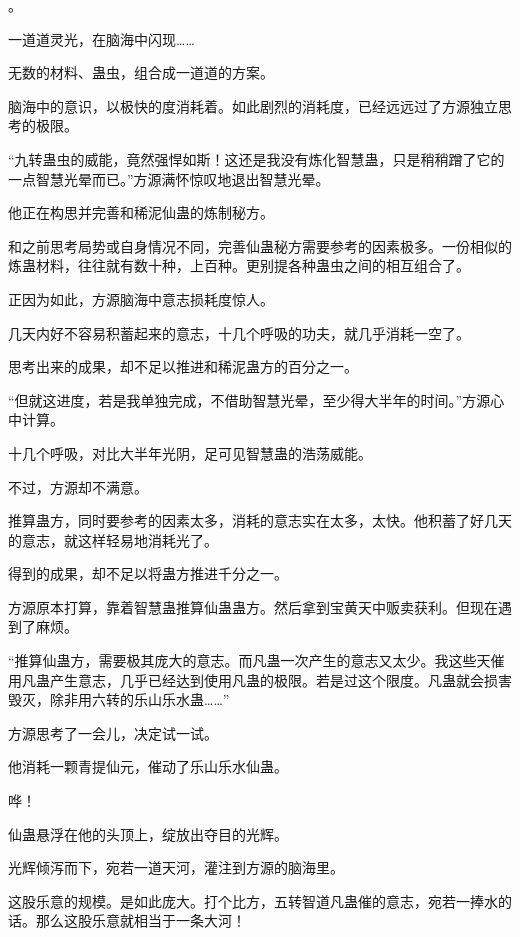 
\begin{this_body}

。

一道道灵光，在脑海中闪现……

无数的材料、蛊虫，组合成一道道的方案。

脑海中的意识，以极快的度消耗着。如此剧烈的消耗度，已经远远过了方源独立思考的极限。

“九转蛊虫的威能，竟然强悍如斯！这还是我没有炼化智慧蛊，只是稍稍蹭了它的一点智慧光晕而已。”方源满怀惊叹地退出智慧光晕。

他正在构思并完善和稀泥仙蛊的炼制秘方。

和之前思考局势或自身情况不同，完善仙蛊秘方需要参考的因素极多。一份相似的炼蛊材料，往往就有数十种，上百种。更别提各种蛊虫之间的相互组合了。

正因为如此，方源脑海中意志损耗度惊人。

几天内好不容易积蓄起来的意志，十几个呼吸的功夫，就几乎消耗一空了。

思考出来的成果，却不足以推进和稀泥蛊方的百分之一。

“但就这进度，若是我单独完成，不借助智慧光晕，至少得大半年的时间。”方源心中计算。

十几个呼吸，对比大半年光阴，足可见智慧蛊的浩荡威能。

不过，方源却不满意。

推算蛊方，同时要参考的因素太多，消耗的意志实在太多，太快。他积蓄了好几天的意志，就这样轻易地消耗光了。

得到的成果，却不足以将蛊方推进千分之一。

方源原本打算，靠着智慧蛊推算仙蛊蛊方。然后拿到宝黄天中贩卖获利。但现在遇到了麻烦。

“推算仙蛊方，需要极其庞大的意志。而凡蛊一次产生的意志又太少。我这些天催用凡蛊产生意志，几乎已经达到使用凡蛊的极限。若是过这个限度。凡蛊就会损害毁灭，除非用六转的乐山乐水蛊……”

方源思考了一会儿，决定试一试。

他消耗一颗青提仙元，催动了乐山乐水仙蛊。

哗！

仙蛊悬浮在他的头顶上，绽放出夺目的光辉。

光辉倾泻而下，宛若一道天河，灌注到方源的脑海里。

这股乐意的规模。是如此庞大。打个比方，五转智道凡蛊催的意志，宛若一捧水的话。那么这股乐意就相当于一条大河！


\end{this_body}
